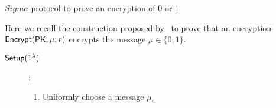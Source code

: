 \begin{section}{$Sigma$-protocol to prove an encryption of $0$ or $1$~\cite{DBLP:conf/pkc/ChaidosG15}}

  Here we recall the construction proposed by~\cite{DBLP:conf/pkc/ChaidosG15} to prove that an encryption ${\mathsf{Encrypt}}(\mathsf{PK},\mu; r)$ encrypts the message $\mu \in \{0,1\}$.
  
  \begin{description}
  \item[${\mathsf{Setup}}(1^{\lambda})$]:
    \begin{enumerate}
    \item Uniformly choose a message $\mu_a$ 
    \end{enumerate}
  \end{description}

\end{section}
